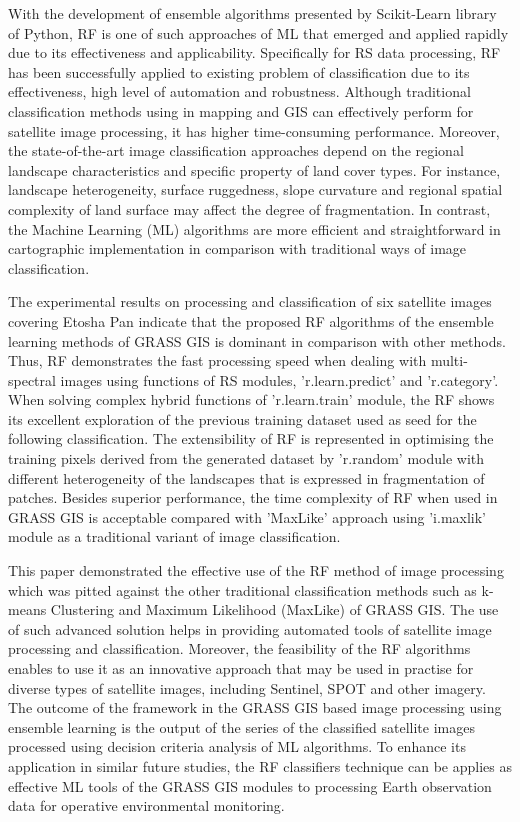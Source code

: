 \documentclass[climate,article,submit,pdftex,moreauthors]{Definitions/mdpi}
\begin{document}
With the development of ensemble algorithms presented by Scikit-Learn library of Python, RF is one of such approaches of ML that emerged and applied rapidly due to its effectiveness and applicability. Specifically for RS data processing, RF has been successfully applied to existing problem of classification due to its effectiveness, high level of automation and robustness. Although traditional classification methods using in mapping and GIS can effectively perform for satellite image processing, it has higher time-consuming performance. Moreover, the state-of-the-art image classification approaches depend on the regional landscape characteristics and specific property of land cover types. For instance, landscape heterogeneity, surface ruggedness, slope curvature and regional spatial complexity of land surface may affect the degree of fragmentation. In contrast, the Machine Learning (ML) algorithms are more efficient and straightforward in cartographic implementation in comparison with traditional ways of image classification. 

The experimental results on processing and classification of six satellite images covering Etosha Pan indicate that the proposed RF algorithms of the ensemble learning methods of GRASS GIS is dominant in comparison with other methods. Thus, RF demonstrates the fast processing speed when dealing with multi-spectral images using functions of RS modules, 'r.learn.predict' and 'r.category'. When solving complex hybrid functions of 'r.learn.train' module, the RF shows its excellent exploration of the previous training dataset used as seed for the following classification. The extensibility of RF is represented in optimising the training pixels derived from the generated dataset by 'r.random' module with different heterogeneity of the landscapes that is expressed in fragmentation of patches. Besides superior performance, the time complexity of RF when used in GRASS GIS is acceptable compared with 'MaxLike' approach using 'i.maxlik' module as a traditional variant of image classification.

This paper demonstrated the effective use of the RF method of image processing which was pitted against the other traditional classification methods such as k-means Clustering and Maximum Likelihood (MaxLike) of GRASS GIS. The use of such advanced solution helps in providing automated tools of satellite image processing and classification. Moreover, the feasibility of the RF algorithms enables to use it as an innovative approach that may be used in practise for diverse types of satellite images, including Sentinel, SPOT and other imagery. The outcome of the framework in the GRASS GIS based image processing using ensemble learning is the output of the series of the classified satellite images processed using decision criteria analysis of ML algorithms. To enhance its application in similar future studies, the RF classifiers technique can be applies as effective ML tools of the GRASS GIS modules to processing Earth observation data for operative environmental monitoring.
\end{document}
